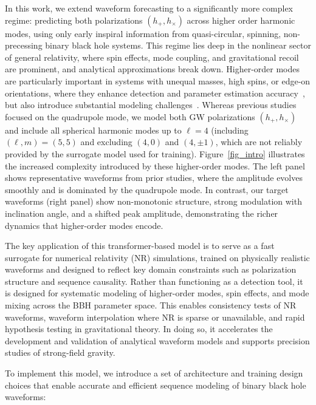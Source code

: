 \documentclass[12pt]{iopart}
\begin{document}
In this work, we extend waveform forecasting to a significantly more complex regime: predicting both polarizations $(h_+, h_\times)$ across higher order harmonic modes, using only early inspiral information from quasi-circular, spinning, non-precessing binary black hole systems. This regime lies deep in the nonlinear sector of general relativity, where spin effects, mode coupling, and gravitational recoil are prominent, and analytical approximations break down. Higher-order modes are particularly important in systems with unequal masses, high spins, or edge-on orientations, where they enhance detection and parameter estimation accuracy~\cite{Abbott:2020tfl,Ng:2023hom}, but also introduce substantial modeling challenges~\cite{Hu:2022modelerror}.
Whereas previous studies~\cite{dl_rg_lee, PhysRevD.103.064015, khan_huerta_forecast, luo2024multistep} focused on the quadrupole mode, we model both GW polarizations $(h_+, h_\times)$ and include all spherical harmonic modes up to $\ell=4$ (including $(\ell,m)=(5,5)$ and excluding $(4,0)$ and $(4,\pm1)$, which are not reliably provided by the surrogate model used for training). Figure~\ref{fig_intro} illustrates the increased complexity introduced by these higher-order modes. The left panel shows representative waveforms from prior studies, where the amplitude evolves smoothly and is dominated by the quadrupole mode. In contrast, our target waveforms (right panel) show non-monotonic structure, strong modulation with inclination angle, and a shifted peak amplitude, demonstrating the richer dynamics that higher-order modes encode.


The key application of this transformer-based model is to serve as a fast surrogate for numerical relativity (NR) simulations, trained on physically realistic waveforms and designed to reflect key domain constraints such as polarization structure and sequence causality.
Rather than functioning as a detection tool, it is designed for systematic modeling of higher-order modes, spin effects, and mode mixing across the BBH parameter space. This enables consistency tests of NR waveforms, waveform interpolation where NR is sparse or unavailable, and rapid hypothesis testing in gravitational theory. 
In doing so, it accelerates the development and validation of analytical waveform models and supports precision studies of strong-field gravity.


To implement this model, we introduce a set of architecture and training design choices that enable accurate and efficient sequence modeling of binary black hole waveforms:
\end{document}
